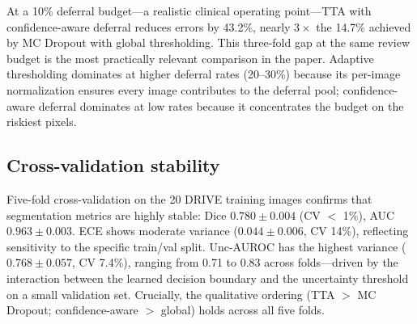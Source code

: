 At a 10\% deferral budget---a realistic clinical operating point---TTA with
confidence-aware deferral reduces errors by 43.2\%, nearly $3\times$ the
14.7\% achieved by MC Dropout with global thresholding. This three-fold
gap at the same review budget is the most practically relevant comparison
in the paper. Adaptive thresholding dominates at higher deferral rates
(20--30\%) because its per-image normalization ensures every image
contributes to the deferral pool; confidence-aware deferral dominates at
low rates because it concentrates the budget on the riskiest pixels.

\subsection{Cross-validation stability}
\label{sec:cv}

Five-fold cross-validation on the 20 DRIVE training images confirms that
segmentation metrics are highly stable: Dice $0.780 \pm 0.004$ (CV $<$ 1\%),
AUC $0.963 \pm 0.003$. ECE shows moderate variance ($0.044 \pm 0.006$,
CV 14\%), reflecting sensitivity to the specific train/val split.
Unc-AUROC has the highest variance ($0.768 \pm 0.057$, CV 7.4\%), ranging
from 0.71 to 0.83 across folds---driven by the interaction between the
learned decision boundary and the uncertainty threshold on a small
validation set. Crucially, the qualitative ordering (TTA $>$ MC Dropout;
confidence-aware $>$ global) holds across all five folds.

